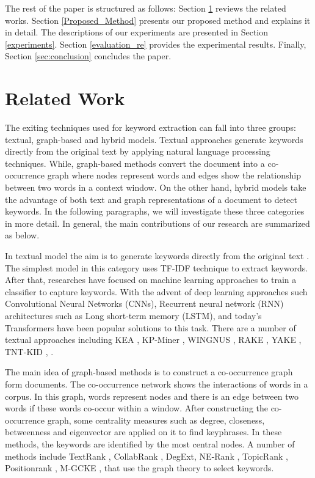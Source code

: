 \documentclass[review,3p]{elsarticle}
\begin{document}
The rest of the paper is structured as follows: Section \ref{related_work} reviews the related works.  Section \ref{Proposed_Method} presents our proposed method and explains it in detail. 
 The descriptions of our experiments are presented in Section \ref{experiments}.  Section \ref{evaluation_re} provides the experimental results. Finally, Section \ref{sec:conclusion} concludes the paper.

\section{Related Work}\label{related_work}
The exiting techniques used for keyword extraction can fall into three groups: textual, graph-based and hybrid models. Textual approaches generate keywords directly from the original text by applying natural language processing techniques. While, graph-based methods convert the document into a co-occurrence graph where nodes represent words and edges show the relationship between two words in a context window. On the other hand,  hybrid models take the advantage of both text and graph representations of a document to detect keywords. In the following paragraphs, we will investigate these three categories in more detail. In general, the main contributions of our research are summarized as below.

In textual model the aim is to generate keywords directly from the original text \cite{wang2019detecting}. The simplest model in this category uses TF-IDF technique to extract keywords.  After that, researches have focused on machine learning approaches to train a classifier to capture keywords. With the advent of deep learning approaches such Convolutional Neural Networks (CNNs), Recurrent neural network (RNN) architectures such as Long short-term memory (LSTM), and today's Transformers have been popular solutions to this task. There are a number of textual approaches including KEA \cite{witten2005kea}, KP-Miner \cite{el2009kp}, WINGNUS \cite{nguyen2010wingnus}, RAKE \cite{rose2010automatic}, YAKE \cite{campos2020yake},  TNT-KID \cite{martinc2020tnt}, \cite{basaldella2018bidirectional, alzaidy2019bi, tang2019progress, wang2019using, kim2020validation}.

The main idea of graph-based methods is to construct a co-occurrence graph form documents.  The co-occurrence network shows the interactions of words in a corpus.  In this graph, words represent nodes and there is an edge between two words if these words co-occur within a window. 
After constructing the co-occurrence graph, some centrality measures such as degree, closeness, betweenness and eigenvector are applied on it to find keyphrases. In these methods, the keywords are identified by the most central nodes. A number of methods include
TextRank \cite{mihalcea2004textrank}, CollabRank \cite{wan2008collabrank}, DegExt\cite{litvak2011degext}, NE-Rank \cite{bellaachia2012ne}, TopicRank \cite{bougouin-etal-2013-topicrank}, Positionrank \cite{florescu2017positionrank},  M-GCKE \cite{wang2019detecting}, \cite{boudin2013comparison, abilhoa2014keyword, tixier2016graph, el2017graph, boudin2018unsupervised, vega2019multi} that use the graph theory to select keywords. 
\end{document}
